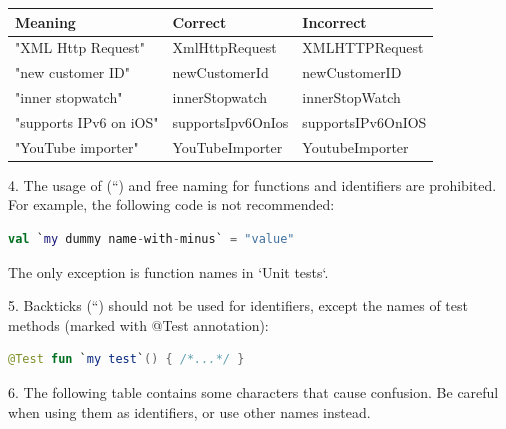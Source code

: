 \begin{center}

\begin{tabular}{ |p{}|p{}|p{}| }

\hline

Meaning&Correct&Incorrect\\

\hline

 "XML Http Request" & XmlHttpRequest & XMLHTTPRequest \\

 "new customer ID" & newCustomerId & newCustomerID \\

 "inner stopwatch" & innerStopwatch & innerStopWatch \\

 "supports IPv6 on iOS" & supportsIpv6OnIos & supportsIPv6OnIOS \\

 "YouTube importer" & YouTubeImporter & YoutubeImporter \\

\hline

\end{tabular}

\end{center}

4.	The usage of (``) and free naming for functions and identifiers are prohibited. For example, the following code is not recommended:



\begin{lstlisting}[language=Kotlin]
val `my dummy name-with-minus` = "value" 
\end{lstlisting}


The only exception is function names in `Unit tests`.



5.	Backticks (``) should not be used for identifiers, except the names of test methods (marked with @Test annotation):

\begin{lstlisting}[language=Kotlin]
 @Test fun `my test`() { /*...*/ }
\end{lstlisting}
6.  The following table contains some characters that cause confusion. Be careful when using them as identifiers, or use other names instead.



